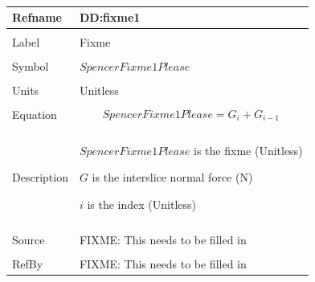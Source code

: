 \documentclass[12pt]{article}
\begin{document}
~\newline
\noindent \begin{minipage}{\textwidth}
\begin{tabular}{p{} p{}}
\toprule \textbf{Refname} & \textbf{DD:fixme1}
\label{DD:fixme1}
\\ \midrule \\
Label & Fixme
\\ \midrule \\
Symbol & $SpencerFixme1Please$
\\ \midrule \\
Units & Unitless
\\ \midrule \\
Equation & \begin{dmath}
           SpencerFixme1Please=G_{i}+G_{i-1}
           \end{dmath}
\\ \midrule \\
Description & \begin{symbDescription}
              \item{$SpencerFixme1Please$ is the fixme (Unitless)}
              \item{$G$ is the interslice normal force (N)}
              \item{$i$ is the index (Unitless)}
              \end{symbDescription}
\\ \midrule \\
Source & FIXME: This needs to be filled in
\\ \midrule \\
RefBy & FIXME: This needs to be filled in
\\ \bottomrule \end{tabular}
\end{minipage}\\
~\newline
\end{document}

